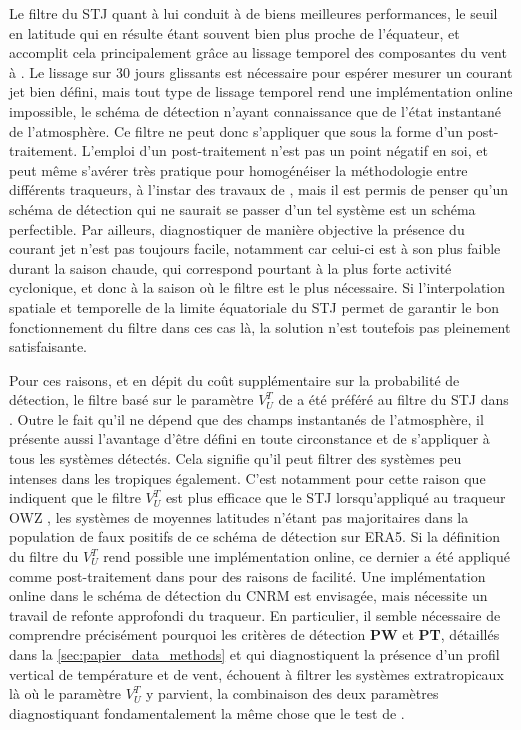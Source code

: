 \documentclass[../main.tex]{subfiles}
\begin{document}
Le filtre du STJ quant à lui conduit à de biens meilleures performances, le seuil en latitude qui en résulte étant souvent bien plus proche de l'équateur, et
accomplit cela principalement grâce au lissage temporel des composantes du vent à . Le lissage sur 30 jours glissants est nécessaire pour espérer
mesurer un courant jet bien défini, mais tout type de lissage temporel rend une implémentation online impossible, le schéma de détection n'ayant connaissance
que de l'état instantané de l'atmosphère. Ce filtre ne peut donc s'appliquer que sous la forme d'un post-traitement. L'emploi d'un post-traitement n'est pas un
point négatif en soi, et peut même s'avérer très pratique pour homogénéiser la méthodologie entre différents traqueurs, à l'instar des travaux de
\textcite{bourdin_intercomparison_2022}, mais il est permis de penser qu'un schéma de détection qui ne saurait se passer d'un tel système est un schéma
perfectible. Par ailleurs, diagnostiquer de manière objective la présence du courant jet n'est pas toujours facile, notamment car celui-ci est à son plus faible
durant la saison chaude, qui correspond pourtant à la plus forte activité cyclonique, et donc à la saison où le filtre est le plus nécessaire. Si
l'interpolation spatiale et temporelle de la limite équatoriale du STJ permet de garantir le bon fonctionnement du filtre dans ces cas là, la solution n'est
toutefois pas pleinement satisfaisante.

Pour ces raisons, et en dépit du coût supplémentaire sur la probabilité de détection, le filtre basé sur le paramètre $V_U^T$ de \textcite{hart_cyclone_2003} a
été préféré au filtre du STJ dans \textcite{dulac_assessing_2023}. Outre le fait qu'il ne dépend que des champs instantanés de l'atmosphère, il présente aussi
l'avantage d'être défini en toute circonstance et de s'appliquer à tous les systèmes détectés. Cela signifie qu'il peut filtrer des systèmes peu intenses dans
les tropiques également. C'est notamment pour cette raison que \textcite{bourdin_intercomparison_2022} indiquent que le filtre $V_U^T$ est plus efficace que le
STJ lorsqu'appliqué au traqueur OWZ \parencite{tory_importance_2013}, les systèmes de moyennes latitudes n'étant pas majoritaires dans la population de faux
positifs de ce schéma de détection sur ERA5. Si la définition du filtre du $V_U^T$ rend possible une implémentation online, ce dernier a été appliqué comme
post-traitement dans \textcite{dulac_assessing_2023} pour des raisons de facilité. Une implémentation online dans le schéma de détection du CNRM est envisagée,
mais nécessite un travail de refonte approfondi du traqueur. En particulier, il semble nécessaire de comprendre précisément pourquoi les critères de détection
\textbf{PW} et \textbf{PT}, détaillés dans la \cref{sec:papier_data_methods} et qui diagnostiquent la présence d'un profil vertical de température et de vent,
échouent à filtrer les systèmes extratropicaux là où le paramètre $V_U^T$ y parvient, la combinaison des deux paramètres diagnostiquant fondamentalement la même
chose que le test de \citeauthor{hart_cyclone_2003}.
\end{document}
